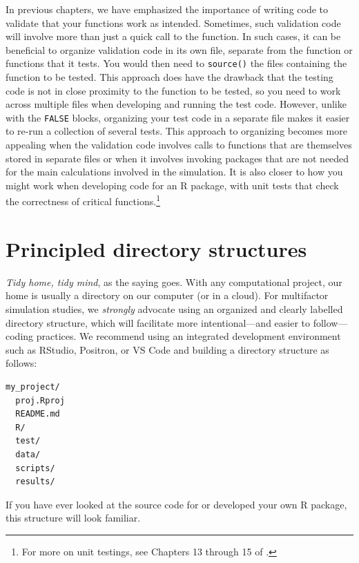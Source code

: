 \documentclass[
]{book}
\begin{document}
In previous chapters, we have emphasized the importance of writing code to validate that your functions work as intended.
Sometimes, such validation code will involve more than just a quick call to the function.
In such cases, it can be beneficial to organize validation code in its own file, separate from the function or functions that it tests.
You would then need to \texttt{source()} the files containing the function to be tested.
This approach does have the drawback that the testing code is not in close proximity to the function to be tested, so you need to work across multiple files when developing and running the test code.
However, unlike with the \texttt{FALSE} blocks, organizing your test code in a separate file makes it easier to re-run a collection of several tests.
This approach to organizing becomes more appealing when the validation code involves calls to functions that are themselves stored in separate files or when it involves invoking packages that are not needed for the main calculations involved in the simulation.
It is also closer to how you might work when developing code for an R package, with unit tests that check the correctness of critical functions.\footnote{For more on unit testings, see Chapters 13 through 15 of \citet{Wickham2023packages}.}

\section{Principled directory structures}\label{principled-directory-structures}

\emph{Tidy home, tidy mind}, as the saying goes.
With any computational project, our home is usually a directory on our computer (or in a cloud).
For multifactor simulation studies, we \emph{strongly} advocate using an organized and clearly labelled directory structure, which will facilitate more intentional---and easier to follow---coding practices.
We recommend using an integrated development environment such as RStudio, Positron, or VS Code and building a directory structure as follows:

\begin{verbatim}
my_project/
  proj.Rproj
  README.md
  R/
  test/
  data/
  scripts/
  results/
\end{verbatim}

If you have ever looked at the source code for or developed your own R package, this structure will look familiar.
\end{document}
